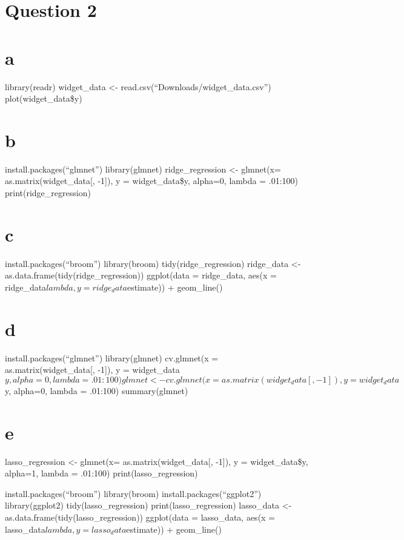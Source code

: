 \documentclass[]{article}
\begin{document}
\section{Question 2}\label{question-2}

\section{a}\label{a-1}

library(readr) widget\_data \textless{}-
read.csv(``Downloads/widget\_data.csv'') plot(widget\_data\$y)

\section{b}\label{b-1}

install.packages(``glmnet'') library(glmnet) ridge\_regression
\textless{}- glmnet(x= as.matrix(widget\_data{[}, -1{]}), y =
widget\_data\$y, alpha=0, lambda = .01:100) print(ridge\_regression)

\section{c}\label{c-1}

install.packages(``broom'') library(broom) tidy(ridge\_regression)
ridge\_data \textless{}- as.data.frame(tidy(ridge\_regression))
ggplot(data = ridge\_data, aes(x =
ridge\_data\(lambda, y = ridge_data\)estimate)) + geom\_line()

\section{d}\label{d-1}

install.packages(``glmnet'') library(glmnet) cv.glmnet(x =
as.matrix(widget\_data{[}, -1{]}), y =
widget\_data\(y, alpha=0, lambda = .01:100) glmnet <- cv.glmnet(x = as.matrix(widget_data[, -1]), y = widget_data\)y,
alpha=0, lambda = .01:100) summary(glmnet)

\section{e}\label{e}

lasso\_regression \textless{}- glmnet(x= as.matrix(widget\_data{[},
-1{]}), y = widget\_data\$y, alpha=1, lambda = .01:100)
print(lasso\_regression)

install.packages(``broom'') library(broom) install.packages(``ggplot2'')
library(ggplot2) tidy(lasso\_regression) print(lasso\_regression)
lasso\_data \textless{}- as.data.frame(tidy(lasso\_regression))
ggplot(data = lasso\_data, aes(x =
lasso\_data\(lambda, y = lasso_data\)estimate)) + geom\_line()
\end{document}
